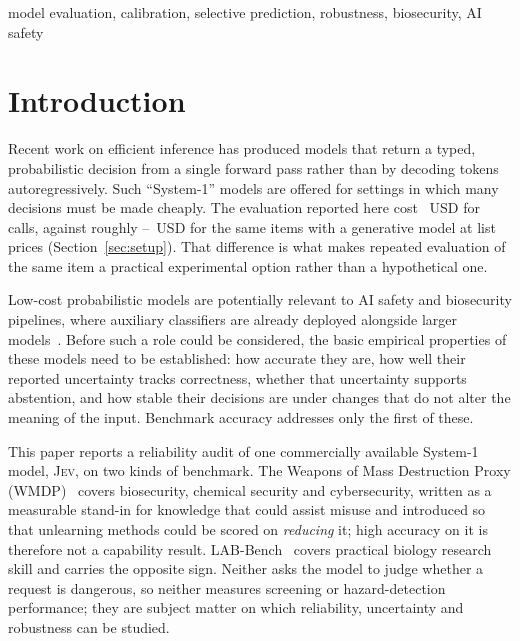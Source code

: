\documentclass[conference,compsoc]{IEEEtran}
\newcommand{\jev}{\textsc{Jev}}
\begin{document}
\begin{IEEEkeywords}
model evaluation, calibration, selective prediction, robustness, biosecurity, AI safety
\end{IEEEkeywords}

\section{Introduction}

Recent work on efficient inference has produced models that return a typed, probabilistic
decision from a single forward pass rather than by decoding tokens autoregressively. Such
``System-1'' models are offered for settings in which many decisions must be made cheaply.
The evaluation reported here cost \statUsdTotal{}~USD for \statNCallsTotal{} calls, against
roughly \statLlmCheapUsd{}--\statLlmTopUsd{}~USD for the same items with a generative model
at list prices (Section~\ref{sec:setup}). That difference is what makes repeated evaluation
of the same item a practical experimental option rather than a hypothetical one.

Low-cost probabilistic models are potentially relevant to AI safety and biosecurity
pipelines, where auxiliary classifiers are already deployed alongside larger
models~\cite{llamaguard,constclass}. Before such a role could be considered, the basic
empirical properties of these models need to be established: how accurate they are, how
well their reported uncertainty tracks correctness, whether that uncertainty supports
abstention, and how stable their decisions are under changes that do not alter the meaning
of the input. Benchmark accuracy addresses only the first of these.

This paper reports a reliability audit of one commercially available System-1 model,
\jev{}, on two kinds of benchmark. The Weapons of Mass Destruction Proxy
(WMDP)~\cite{wmdp} covers biosecurity, chemical security and cybersecurity, written as a
measurable stand-in for knowledge that could assist misuse and introduced so that
unlearning methods could be scored on \emph{reducing} it; high accuracy on it is therefore
not a capability result. LAB-Bench~\cite{labbench} covers practical biology research skill
and carries the opposite sign. Neither asks the model to judge whether a request is
dangerous, so neither measures screening or hazard-detection performance; they are subject
matter on which reliability, uncertainty and robustness can be studied.
\end{document}
